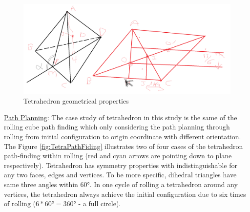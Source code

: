 \begin{figure}[h]
\centering
	\includegraphics[width=\textwidth]{image/TetraGeo1.png}
%	
	\caption{Tetrahedron geometrical properties}
	\label{fig:tetraGeo1}
\end{figure}

\noindent\uline{Path Planning}:
The case study of tetrahedron in this study is the same of the rolling cube path finding which only considering the path planning through rolling from initial configuration to origin coordinate with different orientation. 
The Figure \ref{fig:TetraPathFiding} illustrates two of four cases of the tetrahedron path-finding within rolling (red and cyan arrows are pointing down to plane respectively). Tetrahedron has symmetry properties with indistinguishable for any two faces, edges and vertices. To be more specific, dihedral triangles have same three angles within $\ang{60}$. 
In one cycle of rolling a tetrahedron around any vertices, the tetrahedron always achieve the initial configuration due to six times of rolling ($6*\ang{60}=\ang{360}$ - a full circle). \\


